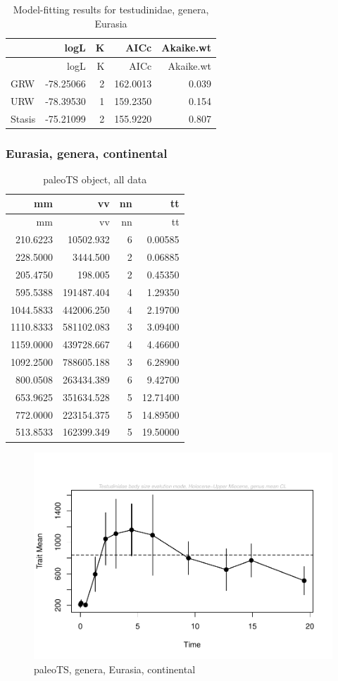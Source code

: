\documentclass[]{article}
\begin{document}
\begin{longtable}[]{@{}lrrrr@{}}
\caption{Model-fitting results for testudinidae, genera,
Eurasia}\tabularnewline
\toprule
& logL & K & AICc & Akaike.wt\tabularnewline
\midrule
\endfirsthead
\toprule
& logL & K & AICc & Akaike.wt\tabularnewline
\midrule
\endhead
GRW & -78.25066 & 2 & 162.0013 & 0.039\tabularnewline
URW & -78.39530 & 1 & 159.2350 & 0.154\tabularnewline
Stasis & -75.21099 & 2 & 155.9220 & 0.807\tabularnewline
\bottomrule
\end{longtable}

\newpage 

\subsubsection{Eurasia, genera,
continental}\label{eurasia-genera-continental}

\begin{longtable}[]{@{}rrrr@{}}
\caption{paleoTS object, all data}\tabularnewline
\toprule
mm & vv & nn & tt\tabularnewline
\midrule
\endfirsthead
\toprule
mm & vv & nn & tt\tabularnewline
\midrule
\endhead
210.6223 & 10502.932 & 6 & 0.00585\tabularnewline
228.5000 & 3444.500 & 2 & 0.06885\tabularnewline
205.4750 & 198.005 & 2 & 0.45350\tabularnewline
595.5388 & 191487.404 & 4 & 1.29350\tabularnewline
1044.5833 & 442006.250 & 4 & 2.19700\tabularnewline
1110.8333 & 581102.083 & 3 & 3.09400\tabularnewline
1159.0000 & 439728.667 & 4 & 4.46600\tabularnewline
1092.2500 & 788605.188 & 3 & 6.28900\tabularnewline
800.0508 & 263434.389 & 6 & 9.42700\tabularnewline
653.9625 & 351634.528 & 5 & 12.71400\tabularnewline
772.0000 & 223154.375 & 5 & 14.89500\tabularnewline
513.8533 & 162399.349 & 5 & 19.50000\tabularnewline
\bottomrule
\end{longtable}

\begin{figure}[htbp]
\centering
\includegraphics{MA_JJ_files/figure-latex/pTSEsC-1.pdf}
\caption{paleoTS, genera, Eurasia, continental}
\end{figure}
\end{document}
